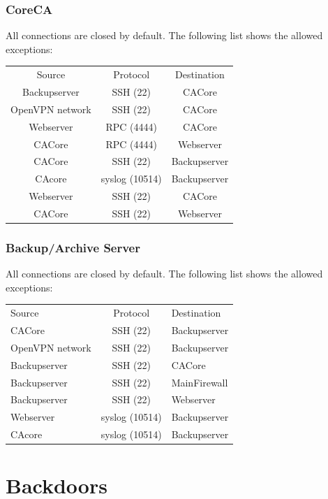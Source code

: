 \documentclass[a4paper, toc=index, 12pt, DIV14, twoside, BCOR2cm, headsepline, numbers=noenddot, bibliography=totoc]{scrbook}
\begin{document}
\subsubsection{CoreCA}
All connections are closed by default. The following list shows the allowed exceptions:\newline


\begin{tabular}{c c c}
Source & Protocol & Destination \\
\cline{1-3}
Backupserver & SSH (22) & CACore \\
\cline{1-3}
OpenVPN network & SSH (22) & CACore \\
\cline{1-3}
Webserver & RPC (4444) & CACore \\
\cline{1-3}
CACore & RPC (4444) & Webserver \\
\cline{1-3}
CACore & SSH (22) & Backupserver \\
\cline{1-3}
CAcore & syslog (10514) & Backupserver \\
\cline{1-3}
Webserver & SSH (22) & CACore \\
\cline{1-3}
CACore & SSH (22) & Webserver \\
\end{tabular}

\subsubsection{Backup/Archive Server}
All connections are closed by default. The following list shows the allowed exceptions:\newline


\begin{tabular}{l c l}
Source & Protocol & Destination \\
\cline{1-3}
CACore & SSH (22) & Backupserver \\
\cline{1-3}
OpenVPN network & SSH (22) &  Backupserver\\
\cline{1-3}
Backupserver & SSH (22) & CACore \\
\cline{1-3}
Backupserver & SSH (22) & MainFirewall \\
\cline{1-3}
Backupserver & SSH (22) & Webserver \\
\cline{1-3}
Webserver & syslog (10514) & Backupserver \\
\cline{1-3}
CAcore & syslog (10514) & Backupserver \\
\end{tabular}



\section{Backdoors}
\end{document}
